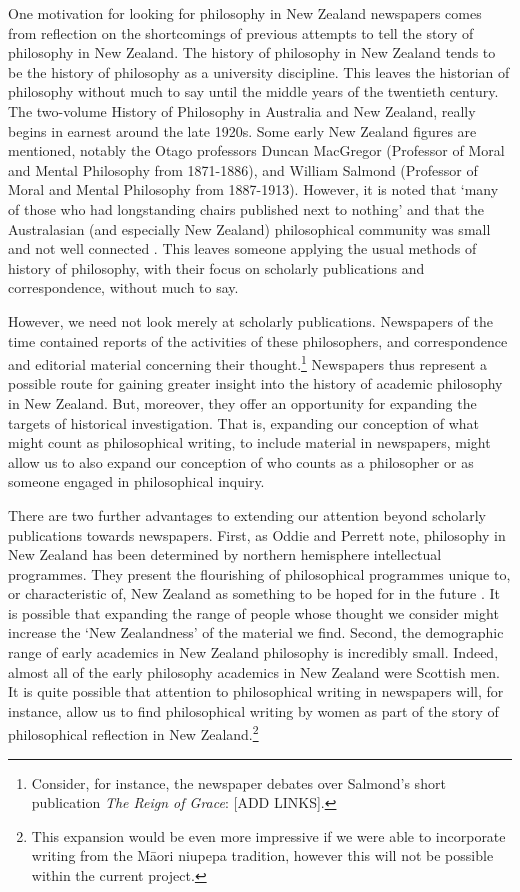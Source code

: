 One motivation for looking for philosophy in New Zealand newspapers comes from reflection on the shortcomings of previous attempts to tell the story of philosophy in New Zealand. The history of philosophy in New Zealand tends to be the history of philosophy as a university discipline. This leaves the historian of philosophy without much to say until the middle years of the twentieth century. The two-volume History of Philosophy in Australia and New Zealand, really begins in earnest around the late 1920s. Some early New Zealand figures are mentioned, notably the Otago professors Duncan MacGregor (Professor of Moral and Mental Philosophy from 1871-1886), and William Salmond (Professor of Moral and Mental Philosophy from 1887-1913). However, it is noted that ‘many of those who had longstanding chairs published next to nothing’ and that the Australasian (and especially New Zealand) philosophical community was small and not well connected \cite[24]{davies-2014}. This leaves someone applying the usual methods of history of philosophy, with their focus on scholarly publications and correspondence, without much to say.

However, we need not look merely at scholarly publications. Newspapers of the time contained reports of the activities of these philosophers, and correspondence and editorial material concerning their thought.\footnote{Consider, for instance, the newspaper debates over Salmond's short publication \textit{The Reign of Grace}: [ADD LINKS].} Newspapers thus represent a possible route for gaining greater insight into the history of academic philosophy in New Zealand. But, moreover, they offer an opportunity for expanding the targets of historical investigation. That is, expanding our conception of what might count as philosophical writing, to include material in newspapers, might allow us to also expand our conception of who counts as a philosopher or as someone engaged in philosophical inquiry.

There are two further advantages to extending our attention beyond scholarly publications towards newspapers. First, as Oddie and Perrett note, philosophy in New Zealand has been determined by northern hemisphere intellectual programmes. They present the flourishing of philosophical programmes unique to, or characteristic of, New Zealand as something to be hoped for in the future \cite[ix--x]{oddie-1992}. %
It is possible that expanding the range of people whose thought we consider might increase the ‘New Zealandness’ of the material we find. Second, the demographic range of early academics in New Zealand philosophy is incredibly small. Indeed, almost all of the early philosophy academics in New Zealand were Scottish men. It is quite possible that attention to philosophical writing in newspapers will, for instance, allow us to find philosophical writing by women as part of the story of philosophical reflection in New Zealand.\footnote{This expansion would be even more impressive if we were able to incorporate writing from the Māori niupepa tradition, however this will not be possible within the current project.}

